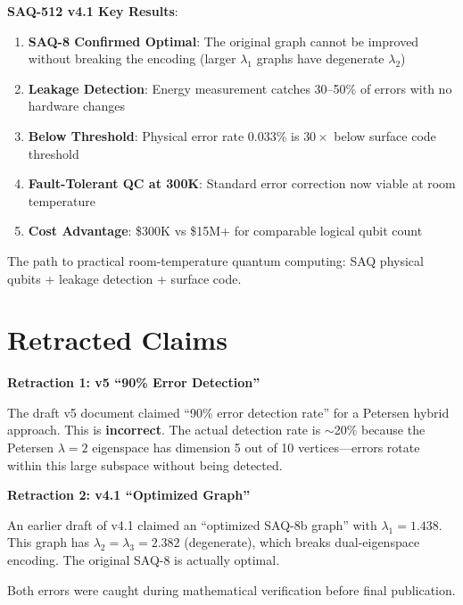 \documentclass[11pt,a4paper]{article}
\theoremstyle{definition}
\begin{document}
\begin{keyresult}
\textbf{SAQ-512 v4.1 Key Results}:

\begin{enumerate}
    \item \textbf{SAQ-8 Confirmed Optimal}: The original graph cannot be improved without breaking the encoding (larger $\lambda_1$ graphs have degenerate $\lambda_2$)
    
    \item \textbf{Leakage Detection}: Energy measurement catches 30--50\% of errors with no hardware changes
    
    \item \textbf{Below Threshold}: Physical error rate 0.033\% is $30\times$ below surface code threshold
    
    \item \textbf{Fault-Tolerant QC at 300K}: Standard error correction now viable at room temperature
    
    \item \textbf{Cost Advantage}: \$300K vs \$15M+ for comparable logical qubit count
\end{enumerate}

The path to practical room-temperature quantum computing: SAQ physical qubits + leakage detection + surface code.
\end{keyresult}

\appendix
\section{Retracted Claims}

\begin{warning}
\textbf{Retraction 1: v5 ``90\% Error Detection''}

The draft v5 document claimed ``90\% error detection rate'' for a Petersen hybrid approach. This is \textbf{incorrect}. The actual detection rate is $\sim$20\% because the Petersen $\lambda=2$ eigenspace has dimension 5 out of 10 vertices---errors rotate within this large subspace without being detected.

\textbf{Retraction 2: v4.1 ``Optimized Graph''}

An earlier draft of v4.1 claimed an ``optimized SAQ-8b graph'' with $\lambda_1 = 1.438$. This graph has $\lambda_2 = \lambda_3 = 2.382$ (degenerate), which breaks dual-eigenspace encoding. The original SAQ-8 is actually optimal.

Both errors were caught during mathematical verification before final publication.
\end{warning}
\end{document}
